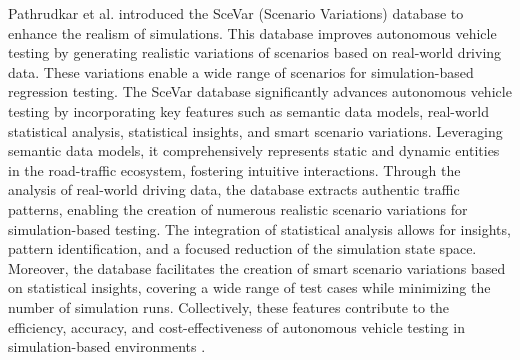 Pathrudkar et al. introduced the SceVar (Scenario Variations) database to enhance the realism of simulations. This database improves autonomous vehicle testing by generating realistic variations of scenarios based on real-world driving data. These variations enable a wide range of scenarios for simulation-based regression testing. The SceVar database significantly advances autonomous vehicle testing by incorporating key features such as semantic data models, real-world statistical analysis, statistical insights, and smart scenario variations. Leveraging semantic data models, it comprehensively represents static and dynamic entities in the road-traffic ecosystem, fostering intuitive interactions. Through the analysis of real-world driving data, the database extracts authentic traffic patterns, enabling the creation of numerous realistic scenario variations for simulation-based testing. The integration of statistical analysis allows for insights, pattern identification, and a focused reduction of the simulation state space. Moreover, the database facilitates the creation of smart scenario variations based on statistical insights, covering a wide range of test cases while minimizing the number of simulation runs. Collectively, these features contribute to the efficiency, accuracy, and cost-effectiveness of autonomous vehicle testing in simulation-based environments \cite{PathrudkarMSC}.